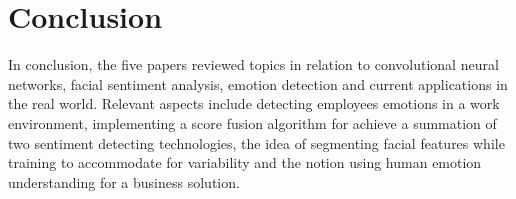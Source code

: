  \section{Conclusion}
 In conclusion, the five papers reviewed topics in relation to convolutional neural networks, facial sentiment analysis, emotion detection and current applications in the real world. Relevant aspects include detecting employees emotions in a work environment, implementing a score fusion algorithm for achieve a summation of two sentiment detecting technologies, the idea of segmenting facial features while training to accommodate for variability and the notion using human emotion understanding for a business solution.